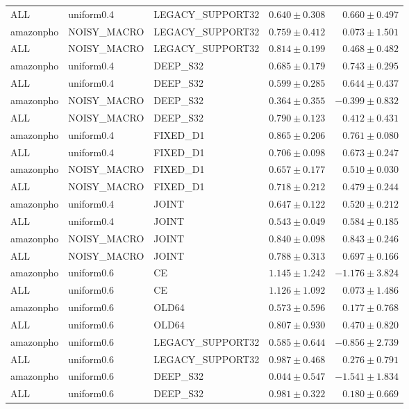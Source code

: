 \begin{longtable}{lllrr}
ALL & uniform0.4 & LEGACY\_SUPPORT32 & $0.640 \pm 0.308$ & $0.660 \pm 0.497$ \\
amazonpho & NOISY\_MACRO & LEGACY\_SUPPORT32 & $0.759 \pm 0.412$ & $0.073 \pm 1.501$ \\
ALL & NOISY\_MACRO & LEGACY\_SUPPORT32 & $0.814 \pm 0.199$ & $0.468 \pm 0.482$ \\
amazonpho & uniform0.4 & DEEP\_S32 & $0.685 \pm 0.179$ & $0.743 \pm 0.295$ \\
ALL & uniform0.4 & DEEP\_S32 & $0.599 \pm 0.285$ & $0.644 \pm 0.437$ \\
amazonpho & NOISY\_MACRO & DEEP\_S32 & $0.364 \pm 0.355$ & $-0.399 \pm 0.832$ \\
ALL & NOISY\_MACRO & DEEP\_S32 & $0.790 \pm 0.123$ & $0.412 \pm 0.431$ \\
amazonpho & uniform0.4 & FIXED\_D1 & $0.865 \pm 0.206$ & $0.761 \pm 0.080$ \\
ALL & uniform0.4 & FIXED\_D1 & $0.706 \pm 0.098$ & $0.673 \pm 0.247$ \\
amazonpho & NOISY\_MACRO & FIXED\_D1 & $0.657 \pm 0.177$ & $0.510 \pm 0.030$ \\
ALL & NOISY\_MACRO & FIXED\_D1 & $0.718 \pm 0.212$ & $0.479 \pm 0.244$ \\
amazonpho & uniform0.4 & JOINT & $0.647 \pm 0.122$ & $0.520 \pm 0.212$ \\
ALL & uniform0.4 & JOINT & $0.543 \pm 0.049$ & $0.584 \pm 0.185$ \\
amazonpho & NOISY\_MACRO & JOINT & $0.840 \pm 0.098$ & $0.843 \pm 0.246$ \\
ALL & NOISY\_MACRO & JOINT & $0.788 \pm 0.313$ & $0.697 \pm 0.166$ \\
amazonpho & uniform0.6 & CE & $1.145 \pm 1.242$ & $-1.176 \pm 3.824$ \\
ALL & uniform0.6 & CE & $1.126 \pm 1.092$ & $0.073 \pm 1.486$ \\
amazonpho & uniform0.6 & OLD64 & $0.573 \pm 0.596$ & $0.177 \pm 0.768$ \\
ALL & uniform0.6 & OLD64 & $0.807 \pm 0.930$ & $0.470 \pm 0.820$ \\
amazonpho & uniform0.6 & LEGACY\_SUPPORT32 & $0.585 \pm 0.644$ & $-0.856 \pm 2.739$ \\
ALL & uniform0.6 & LEGACY\_SUPPORT32 & $0.987 \pm 0.468$ & $0.276 \pm 0.791$ \\
amazonpho & uniform0.6 & DEEP\_S32 & $0.044 \pm 0.547$ & $-1.541 \pm 1.834$ \\
ALL & uniform0.6 & DEEP\_S32 & $0.981 \pm 0.322$ & $0.180 \pm 0.669$ \\

\end{longtable}
